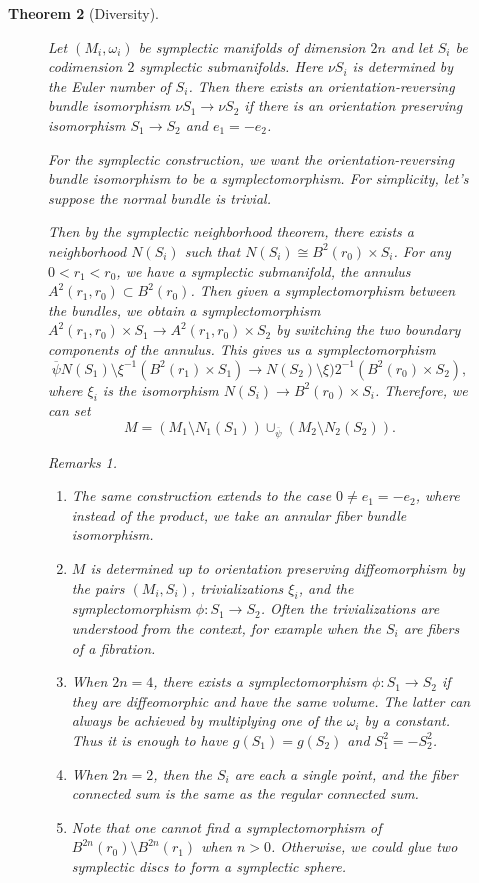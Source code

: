 \documentclass[leqno, openany]{memoir}
\newtheorem{thm}{Theorem}[chapter]
\theoremstyle{definition}
\theoremstyle{remark}
\newtheorem{rmks}[thm]{Remarks}
\theoremstyle{plain}
\theoremstyle{definition}
\theoremstyle{remark}
\begin{document}
\begin{thm}[Diversity]
\begin{figure}[H]
    Let $(M_i, \omega_i)$ be symplectic manifolds of dimension $2n$ and let
    $S_i$ be codimension $2$ symplectic submanifolds. Here $\nu S_i$ is
    determined by the Euler number of $S_i$. Then there exists an
    orientation-reversing bundle isomorphism $\nu S_1 \to \nu S_2$ if there is
    an orientation preserving isomorphism $S_1 \to S_2$ and $e_1 = - e_2$. 

    For the symplectic construction, we want the orientation-reversing bundle
    isomorphism to be a symplectomorphism. For simplicity, let's suppose the
    normal bundle is trivial. 

    Then by the symplectic neighborhood theorem, there exists a neighborhood
    $N(S_i)$ such that $N(S_i) \cong B^2(r_0) \times S_i$. For any $0 < r_1 <
    r_0$, we have a symplectic submanifold, the annulus $A^2(r_1,r_0) \subset
    B^2(r_0)$. Then given a symplectomorphism between the bundles, we obtain a
    symplectomorphism $A^2(r_1, r_0) \times S_1 \to A^2(r_1,r_0) \times S_2$ by
    switching the two boundary components of the annulus. This gives us a
    symplectomorphism \[ \overline{\psi} N(S_1) \setminus \xi^{-1}(B^2(r_1)
    \times S_1) \to N(S_2) \setminus \xi)2^{-1}(B^2(r_0) \times S_2), \] where
    $\xi_i$ is the isomorphism $N(S_i) \to B^2(r_0) \times S_i$. Therefore, we
    can set \[ M = (M_1 \setminus N_1(S_1)) \cup_{\overline{\psi}} (M_2
    \setminus N_2(S_2)). \]

    \begin{rmks} \begin{enumerate} \item The same construction extends to the
        case $0 \neq e_1 = -e_2$, where instead of the product, we take an
        annular fiber bundle isomorphism.  \item $M$ is determined up to
        orientation preserving diffeomorphism by the pairs $(M_i, S_i)$,
        trivializations $\xi_i$, and the symplectomorphism $\phi: S_1 \to S_2$.
        Often the trivializations are understood from the context, for example
        when the $S_i$ are fibers of a fibration.  \item When $2n = 4$, there
        exists a symplectomorphism $\phi: S_1 \to S_2$ if they are
        diffeomorphic and have the same volume. The latter can always be
        achieved by multiplying one of the $\omega_i$ by a constant. Thus it is
        enough to have $g(S_1) = g(S_2)$ and $S_1^2 = -S_2^2$.  \item When $2n
        = 2$, then the $S_i$ are each a single point, and the fiber connected
        sum is the same as the regular connected sum.  \item Note that one
        cannot find a symplectomorphism of $B^{2n}(r_0) \setminus B^{2n}(r_1)$
        when $n > 0$. Otherwise, we could glue two symplectic discs to form a
        symplectic sphere.  \end{enumerate} \end{rmks}


\end{figure}
\end{thm}
\end{document}
